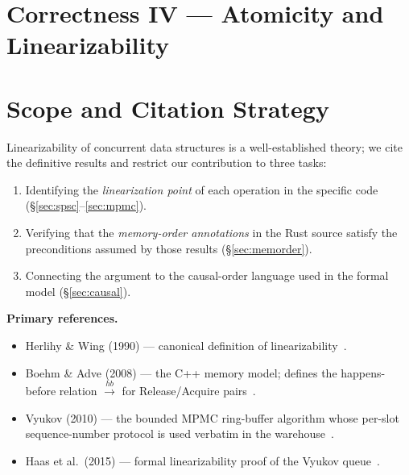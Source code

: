 \documentclass[11pt,a4paper]{article}
\begin{document}

\section*{Correctness IV --- Atomicity and Linearizability}
\label{chap:linearizability}

\setcounter{section}{0}


\section{Scope and Citation Strategy}

Linearizability of concurrent data structures is a well-established
theory; we cite the definitive results and restrict our contribution
to three tasks:
\begin{enumerate}
  \item Identifying the \emph{linearization point} of each operation
        in the specific code (\S\ref{sec:spsc}--\ref{sec:mpmc}).
  \item Verifying that the \emph{memory-order annotations} in the
        Rust source satisfy the preconditions assumed by those results
        (\S\ref{sec:memorder}).
  \item Connecting the argument to the causal-order language used in
        the formal model (\S\ref{sec:causal}).
\end{enumerate}

\medskip\noindent\textbf{Primary references.}
\begin{itemize}
  \item Herlihy \& Wing (1990) --- canonical definition of
        linearizability~\cite{herlihy_wing1990}.
  \item Boehm \& Adve (2008) --- the C++ memory model; defines the
        happens-before relation $\xrightarrow{hb}$ for
        Release/Acquire pairs~\cite{boehm2008}.
  \item Vyukov (2010) --- the bounded MPMC ring-buffer algorithm whose
        per-slot sequence-number protocol is used verbatim in the
        warehouse~\cite{vyukov2010}.
  \item Haas et al.\ (2015) --- formal linearizability proof of the
        Vyukov queue~\cite{haas2015}.
\end{itemize}
\end{document}
